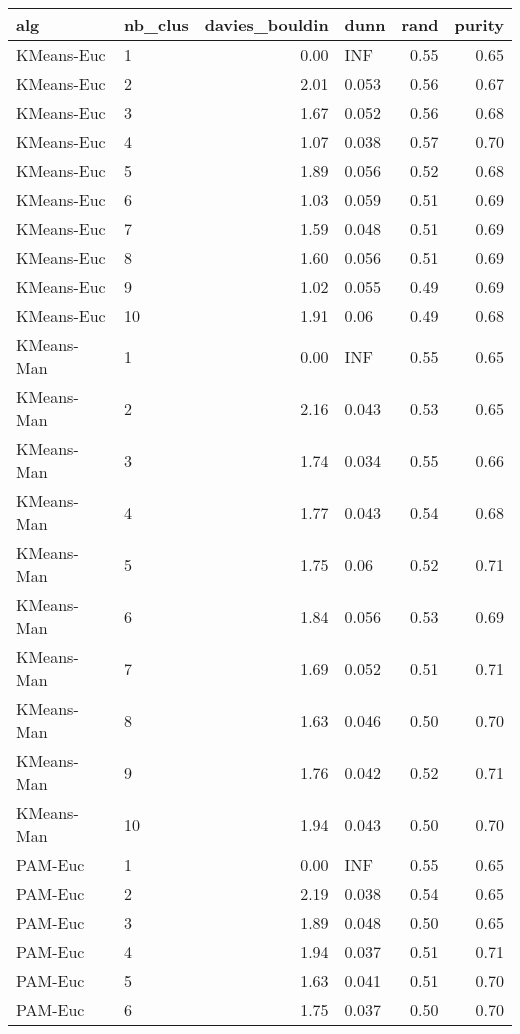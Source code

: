 \begin{table}[ht]
\centering
\begin{tabular}{llrlrr}
  \hline
alg & nb\_clus & davies\_bouldin & dunn & rand & purity \\ 
  \hline
KMeans-Euc & 1 & 0.00 & INF & 0.55 & 0.65 \\ 
  KMeans-Euc & 2 & 2.01 & 0.053 & 0.56 & 0.67 \\ 
  KMeans-Euc & 3 & 1.67 & 0.052 & 0.56 & 0.68 \\ 
  KMeans-Euc & 4 & 1.07 & 0.038 & 0.57 & 0.70 \\ 
  KMeans-Euc & 5 & 1.89 & 0.056 & 0.52 & 0.68 \\ 
  KMeans-Euc & 6 & 1.03 & 0.059 & 0.51 & 0.69 \\ 
  KMeans-Euc & 7 & 1.59 & 0.048 & 0.51 & 0.69 \\ 
  KMeans-Euc & 8 & 1.60 & 0.056 & 0.51 & 0.69 \\ 
  KMeans-Euc & 9 & 1.02 & 0.055 & 0.49 & 0.69 \\ 
  KMeans-Euc & 10 & 1.91 & 0.06 & 0.49 & 0.68 \\ 
  KMeans-Man & 1 & 0.00 & INF & 0.55 & 0.65 \\ 
  KMeans-Man & 2 & 2.16 & 0.043 & 0.53 & 0.65 \\ 
  KMeans-Man & 3 & 1.74 & 0.034 & 0.55 & 0.66 \\ 
  KMeans-Man & 4 & 1.77 & 0.043 & 0.54 & 0.68 \\ 
  KMeans-Man & 5 & 1.75 & 0.06 & 0.52 & 0.71 \\ 
  KMeans-Man & 6 & 1.84 & 0.056 & 0.53 & 0.69 \\ 
  KMeans-Man & 7 & 1.69 & 0.052 & 0.51 & 0.71 \\ 
  KMeans-Man & 8 & 1.63 & 0.046 & 0.50 & 0.70 \\ 
  KMeans-Man & 9 & 1.76 & 0.042 & 0.52 & 0.71 \\ 
  KMeans-Man & 10 & 1.94 & 0.043 & 0.50 & 0.70 \\ 
  PAM-Euc & 1 & 0.00 & INF & 0.55 & 0.65 \\ 
  PAM-Euc & 2 & 2.19 & 0.038 & 0.54 & 0.65 \\ 
  PAM-Euc & 3 & 1.89 & 0.048 & 0.50 & 0.65 \\ 
  PAM-Euc & 4 & 1.94 & 0.037 & 0.51 & 0.71 \\ 
  PAM-Euc & 5 & 1.63 & 0.041 & 0.51 & 0.70 \\ 
  PAM-Euc & 6 & 1.75 & 0.037 & 0.50 & 0.70 \\ 

\end{tabular}
\end{table}
